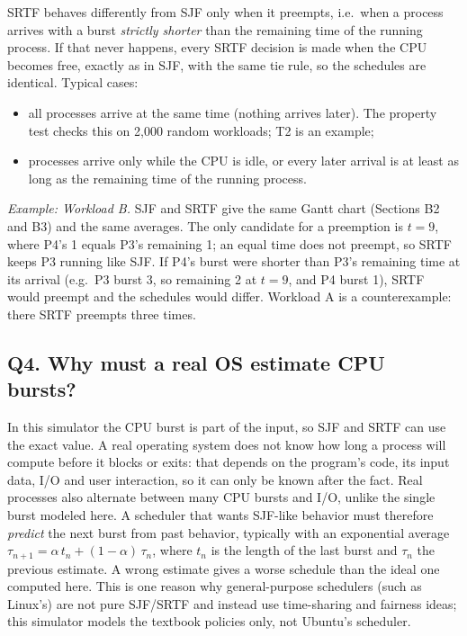 \documentclass[11pt,a4paper]{article}
\begin{document}
SRTF behaves differently from SJF only when it preempts, i.e.\ when a process arrives with a burst \emph{strictly
shorter} than the remaining time of the running process. If that never happens, every SRTF decision is made when the CPU
becomes free, exactly as in SJF, with the same tie rule, so the schedules are identical. Typical cases:
\begin{itemize}
  \item all processes arrive at the same time (nothing arrives later). The property test checks this on 2,000 random
    workloads; T2 is an example;
  \item processes arrive only while the CPU is idle, or every later arrival is at least as long as the remaining time of
    the running process.
\end{itemize}
\emph{Example: Workload B.} SJF and SRTF give the same Gantt chart (Sections B2 and B3) and the same averages. The only
candidate for a preemption is $t=9$, where P4's 1 equals P3's remaining 1; an equal time does not preempt, so SRTF keeps P3
running like SJF. If P4's burst were shorter than P3's remaining time at its arrival (e.g.\ P3 burst 3, so remaining 2 at
$t=9$, and P4 burst 1), SRTF would preempt and the schedules would differ. Workload A is a counterexample: there SRTF
preempts three times.

\subsection*{Q4. Why must a real OS estimate CPU bursts?}

In this simulator the CPU burst is part of the input, so SJF and SRTF can use the exact value. A real operating system
does not know how long a process will compute before it blocks or exits: that depends on the program's code, its input
data, I/O and user interaction, so it can only be known after the fact. Real processes also alternate between many CPU
bursts and I/O, unlike the single burst modeled here. A scheduler that wants SJF-like behavior must therefore
\emph{predict} the next burst from past behavior, typically with an exponential average
$\tau_{n+1} = \alpha\, t_n + (1-\alpha)\,\tau_n$, where $t_n$ is the length of the last burst and $\tau_n$ the previous
estimate. A wrong estimate gives a worse schedule than the ideal one computed here. This is one reason why general-purpose
schedulers (such as Linux's) are not pure SJF/SRTF and instead use time-sharing and fairness ideas; this simulator models
the textbook policies only, not Ubuntu's scheduler.
\end{document}
